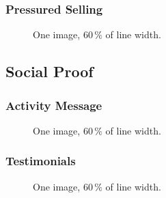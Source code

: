         \subsubsection*{Pressured Selling}
        \blind[1]
        \begin{figure}
            \centering
            \caption{One image, $60\,\%$ of line width.  
              }
            \label{fig:TODO}
        \end{figure}
    \subsection*{Social Proof}
    \blind[1]
        \subsubsection*{Activity Message}
        \blind[1]
        \begin{figure}
            \centering
            \caption{One image, $60\,\%$ of line width.  
              }
            \label{fig:TODO}
        \end{figure}
        \subsubsection*{Testimonials}
        \blind[1]
        \begin{figure}
            \centering
            \caption{One image, $60\,\%$ of line width.  
              }
            \label{fig:TODO}
        \end{figure}
